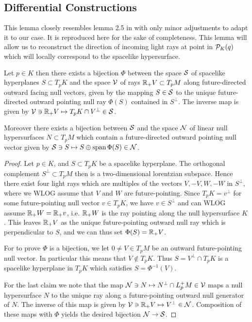 \subsection{Differential Constructions}
This lemma closely resembles lemma 2.5 in \cite{hintzpaper} with only minor adjustments to adapt it to our case. It is reproduced here for the sake of completeness.
This lemma will allow us to reconstruct the direction of incoming light rays at point in ${\mathcal{P}}_K(q)$ which will locally correspond to the spacelike hypersurface.
\begin{lemma}\label{lem:dirreconstr}
Let $p\in K$ then there exists a bijection $\Phi$ between the space ${\mathcal{S}}$ of spacelike hyperplanes $S\subset T_pK$ and the space ${\mathcal{V}}$ of rays $\mathbb{R}_+V\subset T_pM$ along future-directed outward facing null vectors, given by the mapping $S\in {\mathcal{S}}$ to the unique future-directed outward pointing null ray $\Phi(S)$ contained in $S^\perp$. The inverse map is given by ${\mathcal{V}}\ni \mathbb{R}_+V \mapsto T_pK \cap V^\perp\in {\mathcal{S}}$.

Moreover there exists a bijection between ${\mathcal{S}}$ and the space ${\mathcal{N}}$ of linear null hypersurfaces $N\subset T_pM$ which contain a future-directed outward pointing null vector given by ${\mathcal{S}}\ni S\mapsto S\oplus \operatorname{span} \Phi(S)\in {\mathcal{N}}$.
\end{lemma}
\begin{proof}
    Let $p\in K$, and $S\subset T_pK$ be a spacelike hyperplane. The orthogonal complement $S^\perp\subset T_pM$ then is a two-dimensional lorentzian subspace. Hence there exist four light rays which are multiples of the vectors $V,-V,W,-W$ in $S^\perp$, where we WLOG assume that $V$ and $W$ are future-pointing. Since $T_pK=v^\perp$ for some future-pointing null vector $v\in T_pK$, we have $v\in S^\perp$ and can WLOG assume $\mathbb{R}_+W=\mathbb{R}_+v$, i.e. $\mathbb{R}_+W$ is the ray pointing along the null hypersurface $K$. This leaves $\mathbb{R}_+V$ as the unique future-pointing outward null ray which is perpendicular to $S$, and we can thus set $\Phi(S)=\mathbb{R}_+V$.

    For to prove $\Phi$ is a bijection, we let $0\neq V\in T_pM$ be an outward future-pointing null vector. In particular this means that $V\notin T_pK$. Thus $S=V^\perp\cap T_pK$ is a spacelike hyperplane in $T_pK$ which satisfies $S=\Phi^{-1}(V)$.

    For the last claim we note that the map ${\mathcal{N}}\ni N \mapsto N^\perp \cap L^+_pM \in {\mathcal{V}}$ maps a null hypersurface $N$ to the unique ray along a future-pointing outward null generator of $N$. The inverse of this map is given by ${\mathcal{V}}\ni \mathbb{R}_+V\mapsto V^\perp \in {\mathcal{N}}$. Composition of these maps with $\Phi$ yields the desired bijection ${\mathcal{N}}\to {\mathcal{S}}$.
\end{proof}

